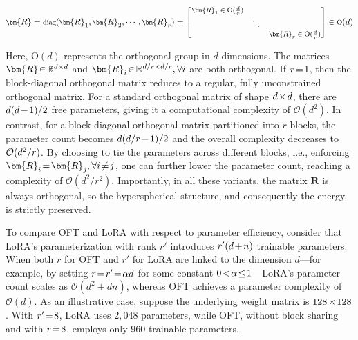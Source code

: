 \begin{equation}
    \footnotesize
    \bm{R}=\text{diag}(\bm{R}_1,\bm{R}_2,\cdots,\bm{R}_r)=\begin{bmatrix}
    \bm{R}_1\in \text{O}(\frac{d}{r}) &  &\\
    &\ddots & \\
    & & \bm{R}_r\in \text{O}(\frac{d}{r})
    \end{bmatrix}\in \text{O}(d)
\end{equation}

Here, $\text{O}(d)$ represents the orthogonal group in $d$ dimensions. The matrices $\thickmuskip=2mu \medmuskip=2mu \bm{R}\in\mathbb{R}^{d\times d}$ and $\thickmuskip=2mu \medmuskip=2mu \bm{R}_i\in\mathbb{R}^{d/r\times d/r},\forall i$ are both orthogonal. If $\thickmuskip=2mu \medmuskip=2mu r=1$, then the block-diagonal orthogonal matrix reduces to a regular, fully unconstrained orthogonal matrix. For a standard orthogonal matrix of shape $\thickmuskip=2mu \medmuskip=2mu d\times d$, there are $\thickmuskip=2mu \medmuskip=2mu d(d-1)/2$ free parameters, giving it a computational complexity of $\mathcal{O}(d^2)$. In contrast, for a block-diagonal orthogonal matrix partitioned into $r$ blocks, the parameter count becomes $\thickmuskip=2mu \medmuskip=2mu d(d/r-1)/2$ and the overall complexity decreases to $\thickmuskip=2mu \medmuskip=2mu \mathcal{O}(d^2/r)$. By choosing to tie the parameters across different blocks, i.e., enforcing $\thickmuskip=2mu \medmuskip=2mu\bm{R}_i=\bm{R}_j,\forall i\neq j$, one can further lower the parameter count, reaching a complexity of $\mathcal{O}(d^2/r^2)$. Importantly, in all these variants, the matrix $\bm{R}$ is always orthogonal, so the hyperspherical structure, and consequently the energy, is strictly preserved.

To compare OFT and LoRA with respect to parameter efficiency, consider that LoRA's parameterization with rank $r'$ introduces $\thickmuskip=2mu \medmuskip=2mu r'(d+n)$ trainable parameters. When both $r$ for OFT and $r'$ for LoRA are linked to the dimension $d$—for example, by setting $\thickmuskip=2mu \medmuskip=2mu r=r'=\alpha d$ for some constant $\thickmuskip=2mu \medmuskip=2mu 0<\alpha\leq 1$—LoRA's parameter count scales as $\mathcal{O}(d^2+dn)$, whereas OFT achieves a parameter complexity of $\mathcal{O}(d)$. As an illustrative case, suppose the underlying weight matrix is $\thickmuskip=2mu \medmuskip=2mu 128\times 128$. With $\thickmuskip=2mu \medmuskip=2mu r'=8$, LoRA uses $2,048$ parameters, while OFT, without block sharing and with $\thickmuskip=2mu \medmuskip=2mu r=8$, employs only $960$ trainable parameters.

